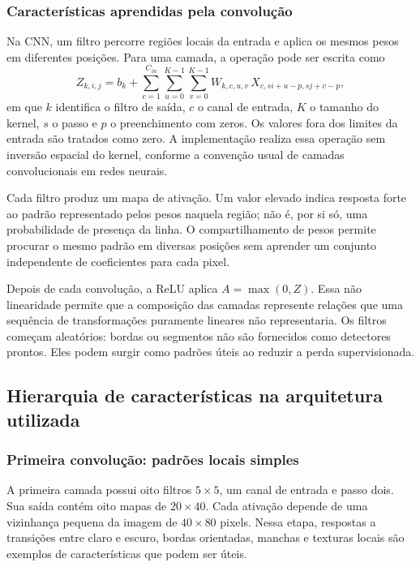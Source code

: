 \documentclass[a4paper,oneside,11pt]{article}
\begin{document}
\subsubsection{Características aprendidas pela convolução}
Na CNN, um filtro percorre regiões locais da entrada e aplica os mesmos pesos em diferentes posições. Para uma camada, a operação pode ser escrita como
\begin{equation}
 Z_{k,i,j}=b_k+\sum_{c=1}^{C_{in}}\sum_{u=0}^{K-1}\sum_{v=0}^{K-1}
 W_{k,c,u,v}\,X_{c,si+u-p,sj+v-p},
\end{equation}
em que $k$ identifica o filtro de saída, $c$ o canal de entrada, $K$ o tamanho do kernel, $s$ o passo e $p$ o preenchimento com zeros. Os valores fora dos limites da entrada são tratados como zero. A implementação realiza essa operação sem inversão espacial do kernel, conforme a convenção usual de camadas convolucionais em redes neurais.

Cada filtro produz um mapa de ativação. Um valor elevado indica resposta forte ao padrão representado pelos pesos naquela região; não é, por si só, uma probabilidade de presença da linha. O compartilhamento de pesos permite procurar o mesmo padrão em diversas posições sem aprender um conjunto independente de coeficientes para cada pixel.

Depois de cada convolução, a ReLU aplica $A=\max(0,Z)$. Essa não linearidade permite que a composição das camadas represente relações que uma sequência de transformações puramente lineares não representaria. Os filtros começam aleatórios: bordas ou segmentos não são fornecidos como detectores prontos. Eles podem surgir como padrões úteis ao reduzir a perda supervisionada.

\subsection{Hierarquia de características na arquitetura utilizada}
\subsubsection{Primeira convolução: padrões locais simples}
A primeira camada possui oito filtros $5\times5$, um canal de entrada e passo dois. Sua saída contém oito mapas de $20\times40$. Cada ativação depende de uma vizinhança pequena da imagem de $40\times80$ pixels. Nessa etapa, respostas a transições entre claro e escuro, bordas orientadas, manchas e texturas locais são exemplos de características que podem ser úteis.
\end{document}
